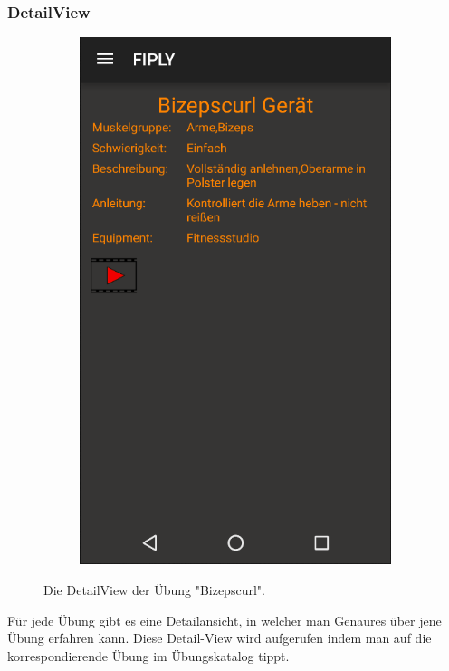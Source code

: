 \documentclass[FIPLY_base.tex]{subfiles}
\begin{document}
\newpage


\subsubsection{DetailView}
\begin{figure}[H]
	\begin{subfigure}[b]{0.3\textwidth}
	\includegraphics[scale=0.55]{img/Uebungskatalog_detail}
	\end{subfigure}
	\hfil
	\caption{Die DetailView der Übung "Bizepscurl".}
\end{figure}



Für jede Übung gibt es eine Detailansicht, in welcher man Genaures über jene Übung erfahren kann.
Diese Detail-View wird aufgerufen indem man auf die korrespondierende Übung im Übungskatalog tippt.
\end{document}
